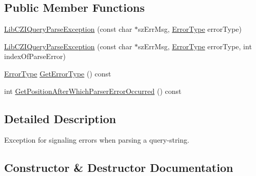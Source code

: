 \subsection*{Public Member Functions}
\begin{DoxyCompactItemize}
\item 
\hyperlink{classlib_c_z_i_1_1_lib_c_z_i_query_parse_exception_a9c01ed75a7d690006bae37444a08a2a7}{Lib\+C\+Z\+I\+Query\+Parse\+Exception} (const char $\ast$sz\+Err\+Msg, \hyperlink{classlib_c_z_i_1_1_lib_c_z_i_query_parse_exception_adf5a11c2415ec7c92d95365fa5af2fde}{Error\+Type} error\+Type)
\item 
\hyperlink{classlib_c_z_i_1_1_lib_c_z_i_query_parse_exception_a93adeb0fad20a3c8c4ea7ba68e49d127}{Lib\+C\+Z\+I\+Query\+Parse\+Exception} (const char $\ast$sz\+Err\+Msg, \hyperlink{classlib_c_z_i_1_1_lib_c_z_i_query_parse_exception_adf5a11c2415ec7c92d95365fa5af2fde}{Error\+Type} error\+Type, int index\+Of\+Parse\+Error)
\item 
\hyperlink{classlib_c_z_i_1_1_lib_c_z_i_query_parse_exception_adf5a11c2415ec7c92d95365fa5af2fde}{Error\+Type} \hyperlink{classlib_c_z_i_1_1_lib_c_z_i_query_parse_exception_a22088facd6fc204fcaf44867bfaeb8bc}{Get\+Error\+Type} () const
\item 
int \hyperlink{classlib_c_z_i_1_1_lib_c_z_i_query_parse_exception_ae880a97ae7923437190a968d5865b86e}{Get\+Position\+After\+Which\+Parser\+Error\+Occurred} () const
\end{DoxyCompactItemize}


\subsection{Detailed Description}
Exception for signaling errors when parsing a query-\/string. 

\subsection{Constructor \& Destructor Documentation}
\mbox{\label{classlib_c_z_i_1_1_lib_c_z_i_query_parse_exception_a9c01ed75a7d690006bae37444a08a2a7}} 
